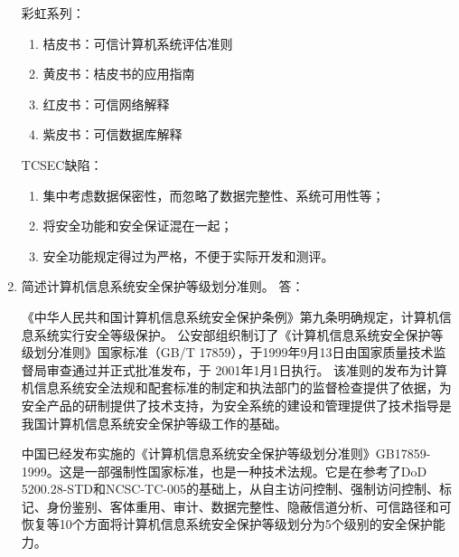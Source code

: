 \documentclass[degree=project,degree-type=project,cjk-font=noto]{thuthesis}
\begin{document}
\begin{enumerate}
彩虹系列：

\begin{enumerate}
	\item 桔皮书：可信计算机系统评估准则
	\item 黄皮书：桔皮书的应用指南
	\item 红皮书：可信网络解释
	\item 紫皮书：可信数据库解释
\end{enumerate}

TCSEC缺陷：

\begin{enumerate}
	\item 集中考虑数据保密性，而忽略了数据完整性、系统可用性等；
	\item 将安全功能和安全保证混在一起；
	\item 安全功能规定得过为严格，不便于实际开发和测评。
\end{enumerate}

\item 简述计算机信息系统安全保护等级划分准则。
\newline
{\heiti 答：}
\newline

《中华人民共和国计算机信息系统安全保护条例》第九条明确规定，计算机信息系统实行安全等级保护。
公安部组织制订了《计算机信息系统安全保护等级划分准则》国家标准（GB/T 17859），于1999年9月13日由国家质量技术监督局审查通过并正式批准发布，于 2001年1月1日执行。
该准则的发布为计算机信息系统安全法规和配套标准的制定和执法部门的监督检查提供了依据，为安全产品的研制提供了技术支持，为安全系统的建设和管理提供了技术指导是我国计算机信息系统安全保护等级工作的基础。

中国已经发布实施的《计算机信息系统安全保护等级划分准则》GB17859-1999。这是一部强制性国家标准，也是一种技术法规。它是在参考了DoD 5200.28-STD和NCSC-TC-005的基础上，从自主访问控制、强制访问控制、标记、身份鉴别、客体重用、审计、数据完整性、隐蔽信道分析、可信路径和可恢复等10个方面将计算机信息系统安全保护等级划分为5个级别的安全保护能力。


\end{enumerate}
\end{document}
